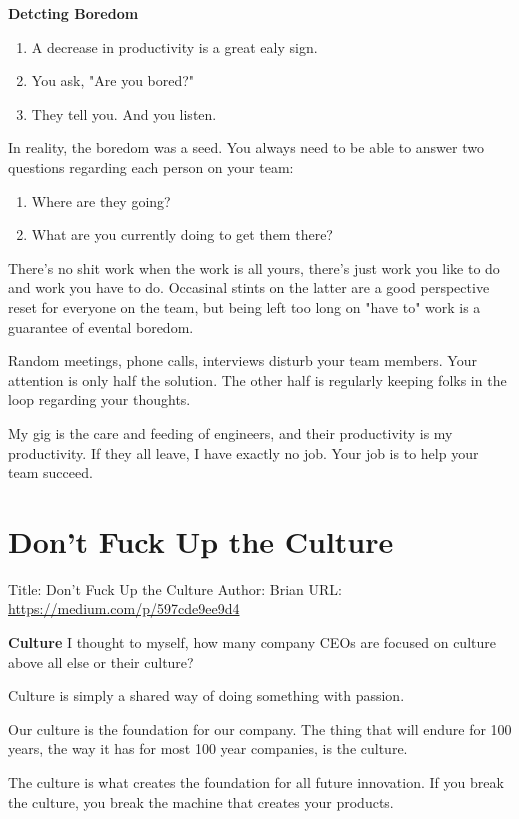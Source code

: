 {\bf Detcting Boredom}
\begin{enumerate}
\item A decrease in productivity is a great ealy sign.
\item You ask, "Are you bored?"
\item They tell you. And you listen.
\end{enumerate}

In reality, the boredom was a seed.
You always need to be able to answer two questions regarding each person on your team:
\begin{enumerate}
\item Where are they going?
\item What are you currently doing to get them there?
\end{enumerate}

There's no shit work when the work is all yours,
there's just work you like to do and work you have to do.
Occasinal stints on the latter are a good perspective reset for everyone on the team,
but being left too long on "have to" work is a guarantee of evental boredom.

Random meetings, phone calls, interviews disturb your team members.
Your attention is only half the solution. 
The other half is regularly keeping folks in the loop regarding your thoughts.

My gig is the care and feeding of engineers, 
and their productivity is my productivity.
If they all leave, I have exactly no job.
Your job is to help your team succeed.

\section{Don't Fuck Up the Culture}
Title: Don't Fuck Up the Culture \newline
Author: Brian \newline
URL: \url{https://medium.com/p/597cde9ee9d4} \newline

{\bf Culture}
I thought to myself, how many company CEOs
are focused on culture above all else or their culture?

Culture is simply a shared way of doing something with passion.

Our culture is the foundation for our company. 
The thing that will endure for 100 years, 
the way it has for most 100 year companies, 
is the culture.

The culture is what creates the foundation for all future innovation. 
If you break the culture,
you break the machine that creates your products.

